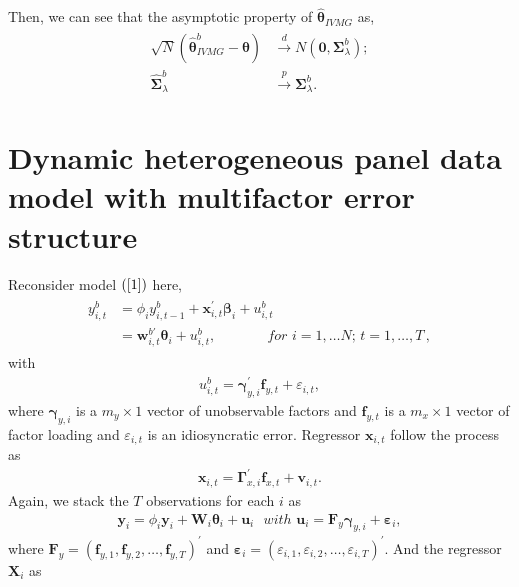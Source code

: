 \documentclass[12pt,a4paper,hyperref]{article}
\begin{document}
Then, we can see that the asymptotic property of $\hat{\boldsymbol{\theta}}_{IVMG} $ as,
\begin{align}
\begin{split}
\sqrt{N}\left(\hat{\boldsymbol{\theta}}^{b}_{IVMG}-\boldsymbol{\theta}  \right)&\overset{d}{\to} N\left(\boldsymbol{0},\boldsymbol{\Sigma}^{b}_{\lambda} \right); \\
 \hat{\boldsymbol{\Sigma}}^{b}_{\lambda} & \overset{p}{\to}   \boldsymbol{\Sigma}^{b}_{\lambda}.
\end{split}
\end{align}

\section{Dynamic heterogeneous panel data model with multifactor error structure}
Reconsider model $(\ref{1})$ here,
\begin{align}
\begin{split}
y^{b}_{i,t}&=\phi_{i} y^{b}_{i,t-1}+ \boldsymbol{x}^{'}_{i,t}\boldsymbol{\beta}_{i}+u^{b}_{i,t}  \\
&= \boldsymbol{w}^{b'}_{i,t}\boldsymbol{\theta}_{i}+u^{b}_{i,t}, \,\,\,\, \,\, \,\, \,\,\,\, \,\,\,\, \,\,\,\, \,\, for\,\,i=1,\ldots N;\,t=1,\ldots,T\, , \label{m1}
\end{split}
\end{align}
with
\begin{align}
u^{b}_{i,t}=\boldsymbol{\gamma}^{'}_{y,i}\boldsymbol{f}_{y,t}+\varepsilon_{i,t},
\end{align}
where $\boldsymbol{\gamma}_{y,i}$ is a $m_{y} \times 1$ vector of unobservable factors and $\boldsymbol{f}_{y,t}$ is a $m_{x} \times 1$ vector of factor loading and $\varepsilon_{i,t}$ is an idiosyncratic error.
Regressor $\boldsymbol{x}_{i,t}$ follow the process as
\begin{align}
 \boldsymbol{x}_{i,t}=\boldsymbol{\Gamma}^{'}_{x,i}\boldsymbol{f}_{x,t}+ \boldsymbol{v}_{i,t}.
\end{align}
Again, we stack the $T$ observations for each $i$ as
\begin{align}
\boldsymbol{y}_{i}= \phi_{i} \boldsymbol{y}_{i}+\boldsymbol{W}_{i}\boldsymbol{\theta}_{i}+\boldsymbol{u}_{i}\,\,\,\, with\,\,\boldsymbol{u}_{i}=\boldsymbol{F}_{y}\boldsymbol{\gamma}_{y,i}+\boldsymbol{\varepsilon}_{i},
\end{align}
where $\boldsymbol{F}_{y}=\left( \boldsymbol{f}_{y,1}, \boldsymbol{f}_{y,2},\ldots,\boldsymbol{f}_{y,T}  \right)^{'}$ and $\boldsymbol{\varepsilon}_{i}=\left( \varepsilon_{i,1}, \varepsilon_{i,2},\ldots,\varepsilon_{i,T} \right)^{'}$. And the regressor $\boldsymbol{X}_{i}$ as
\end{document}
